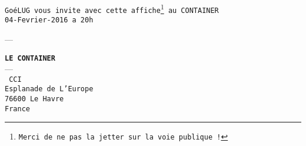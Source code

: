 \begin{slide}


\begin{center}
\texttt{GoéLUG vous invite avec cette affiche\footnote{Merci de ne pas la jetter sur la voie publique !} au CONTAINER} \\
\texttt{04-Fevrier-2016 a 20h}

---

\texttt{\textbf{LE CONTAINER}} \\
--- \\
\texttt{
CCI \\
Esplanade de L'Europe \\
76600 Le Havre \\
France
}
\end{center}



\end{slide}